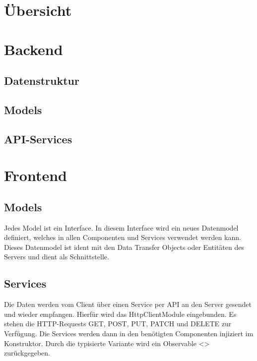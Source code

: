 \section{Übersicht}
\lipsum[10]

\section{Backend}

\subsection{Datenstruktur}
\subsection{Models}
\subsection{API-Services}

\section{Frontend}

\subsection{Models}
Jedes Model ist ein Interface. In diesem Interface wird ein neues Datenmodel definiert,
welches in allen Componenten und Services verwendet werden kann. Dieses Datenmodel
ist ident mit den Data Transfer Objects oder Entitäten des Servers und dient als
Schnittstelle.
\subsection{Services}
Die Daten werden vom Client über einen Service per API an den Server gesendet
und wieder empfangen. Hierfür wird das HttpClientModule eingebunden. Es stehen
die HTTP-Requests GET, POST, PUT, PATCH und DELETE zur Verfügung. Die
Services werden dann in den benötigten Componenten injiziert im Konstruktor. Durch
die typisierte Variante wird ein Observable <> zurückgegeben.